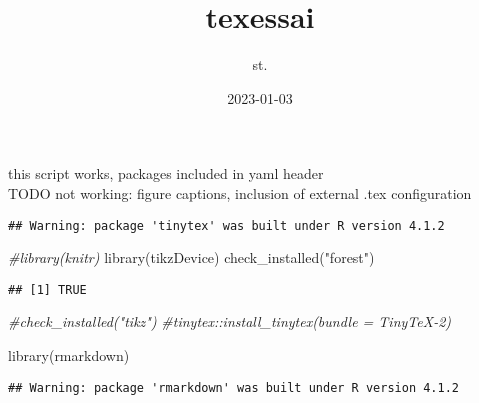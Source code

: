 \documentclass[
]{article}
\title{texessai}
\author{st.}
\date{2023-01-03}
\newenvironment{Shaded}{\begin{snugshade}}{\end{snugshade}}
\newcommand{\AttributeTok}[1]{\textcolor[rgb]{0.77,0.63,0.00}{#1}}
\newcommand{\CommentTok}[1]{\textcolor[rgb]{0.56,0.35,0.01}{\textit{#1}}}
\newcommand{\ConstantTok}[1]{\textcolor[rgb]{0.00,0.00,0.00}{#1}}
\newcommand{\FunctionTok}[1]{\textcolor[rgb]{0.00,0.00,0.00}{#1}}
\newcommand{\NormalTok}[1]{#1}
\newcommand{\SpecialCharTok}[1]{\textcolor[rgb]{0.00,0.00,0.00}{#1}}
\newcommand{\StringTok}[1]{\textcolor[rgb]{0.31,0.60,0.02}{#1}}
\begin{document}
\maketitle

this script works, packages included in yaml header\\
TODO not working: figure captions, inclusion of external .tex
configuration

\begin{Shaded}
\end{Shaded}

\begin{verbatim}
## Warning: package 'tinytex' was built under R version 4.1.2
\end{verbatim}

\begin{Shaded}
\begin{Highlighting}[]
\CommentTok{\#library(knitr)}
\FunctionTok{library}\NormalTok{(tikzDevice)}
\FunctionTok{check\_installed}\NormalTok{(}\StringTok{"forest"}\NormalTok{)}
\end{Highlighting}
\end{Shaded}

\begin{verbatim}
## [1] TRUE
\end{verbatim}

\begin{Shaded}
\begin{Highlighting}[]
\CommentTok{\#check\_installed("tikz")}
\CommentTok{\#tinytex::install\_tinytex(bundle = \textquotesingle{}TinyTeX{-}2\textquotesingle{})}


\FunctionTok{library}\NormalTok{(rmarkdown)}
\end{Highlighting}
\end{Shaded}

\begin{verbatim}
## Warning: package 'rmarkdown' was built under R version 4.1.2
\end{verbatim}
\end{document}
